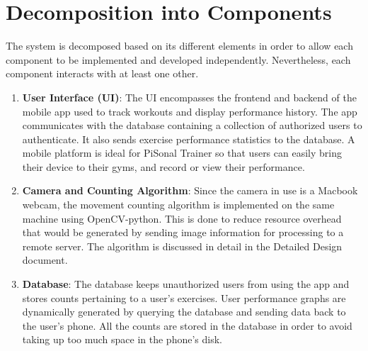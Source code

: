 \documentclass{article}
\begin{document}
\section{Decomposition into Components}
The system is decomposed based on its different elements in order to allow each component to be implemented and developed independently. Nevertheless, each component interacts with at least one other.
\begin{enumerate}
\item \textbf{User Interface (UI)}: The UI encompasses the frontend and backend of the mobile app used to track workouts and display performance history. The app communicates with the database containing a collection of authorized users to authenticate. It also sends exercise performance statistics to the database. A mobile platform is ideal for PiSonal Trainer so that users can easily bring their device to their gyms, and record or view their performance.

\item \textbf{Camera and Counting Algorithm}: Since the camera in use is a Macbook webcam, the movement counting algorithm is implemented on the same machine using OpenCV-python. This is done to reduce resource overhead that would be generated by sending image information for processing to a remote server. The algorithm is discussed in detail in the Detailed Design document.

\item \textbf{Database}: The database keeps unauthorized users from using the app and stores counts pertaining to a user's exercises. User performance graphs are dynamically generated by querying the database and sending data back to the user's phone. All the counts are stored in the database in order to avoid taking up too much space in the phone's disk.
\end{enumerate}

\newpage

\begingroup
\begin{center}
\begin{figure}[h]
\end{figure}
\end{center}
\endgroup
\end{document}
